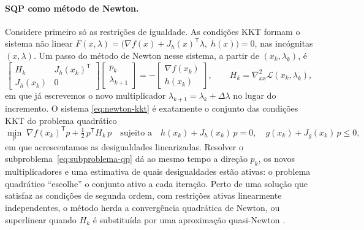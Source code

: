 \documentclass[12pt, oneside, a4paper, english, brazil]{abntex2}
\theoremstyle{relatorio}
\theoremstyle{relatorioit}
\theoremstyle{problema}
\begin{document}
\paragraph{SQP como método de Newton.} Considere primeiro só as restrições de igualdade.
As condições KKT formam o sistema não linear
$F(x, \lambda) = \bigl(\nabla f(x) + J_h(x)^{\mathsf T}\lambda,\; h(x)\bigr) = 0$, nas
incógnitas $(x, \lambda)$. Um passo do método de Newton nesse sistema, a partir de
$(x_k, \lambda_k)$, é
\begin{equation}
  \begin{bmatrix} H_k & J_h(x_k)^{\mathsf T} \\ J_h(x_k) & 0 \end{bmatrix}
  \begin{bmatrix} p_k \\ \lambda_{k+1} \end{bmatrix}
  = - \begin{bmatrix} \nabla f(x_k) \\ h(x_k) \end{bmatrix},
  \qquad H_k = \nabla^2_{xx}\mathcal{L}(x_k, \lambda_k),
  \label{eq:newton-kkt}
\end{equation}
em que já escrevemos o novo multiplicador $\lambda_{k+1} = \lambda_k + \Delta\lambda$ no
lugar do incremento. O sistema \eqref{eq:newton-kkt} é exatamente o conjunto das
condições KKT do problema quadrático
\begin{equation}
  \min_{p} \; \nabla f(x_k)^{\mathsf T} p + \tfrac12\, p^{\mathsf T} H_k\, p
  \quad \text{sujeito a} \quad
  h(x_k) + J_h(x_k)\, p = 0, \quad g(x_k) + J_g(x_k)\, p \le 0,
  \label{eq:subproblema-qp}
\end{equation}
em que acrescentamos as desigualdades linearizadas. Resolver o
subproblema~\eqref{eq:subproblema-qp} dá ao mesmo tempo a direção $p_k$, os novos
multiplicadores e uma estimativa de quais desigualdades estão ativas: o problema
quadrático ``escolhe'' o conjunto ativo a cada iteração. Perto de uma solução que
satisfaz as condições de segunda ordem, com restrições ativas linearmente
independentes, o método herda a convergência quadrática de Newton, ou superlinear
quando $H_k$ é substituída por uma aproximação quasi-Newton
\parencite[seção~18.7]{nocedal2006}.
\end{document}
